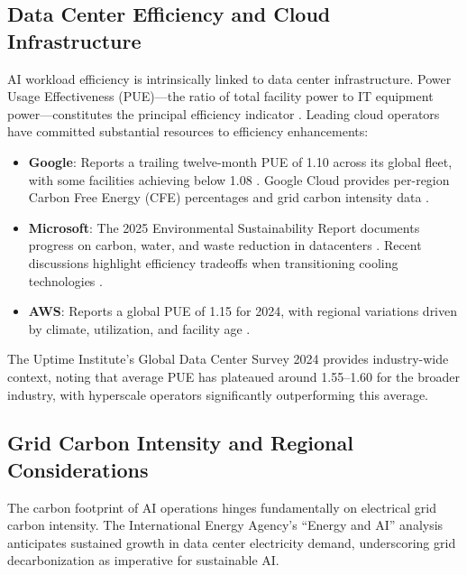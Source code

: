 \documentclass[11pt]{article}
\begin{document}
\subsection{Data Center Efficiency and Cloud Infrastructure}

AI workload efficiency is intrinsically linked to data center infrastructure. Power Usage Effectiveness (PUE)---the ratio of total facility power to IT equipment power---constitutes the principal efficiency indicator \cite{iso2026pue}. Leading cloud operators have committed substantial resources to efficiency enhancements:

\begin{itemize}
    \item \textbf{Google}: Reports a trailing twelve-month PUE of 1.10 across its global fleet, with some facilities achieving below 1.08 \cite{google2024envreport}. Google Cloud provides per-region Carbon Free Energy (CFE) percentages and grid carbon intensity data \cite{googlecloud2026cfe}.
    \item \textbf{Microsoft}: The 2025 Environmental Sustainability Report documents progress on carbon, water, and waste reduction in datacenters \cite{microsoft2025sustainability}. Recent discussions highlight efficiency tradeoffs when transitioning cooling technologies \cite{microsoft2024datacenter}.
    \item \textbf{AWS}: Reports a global PUE of 1.15 for 2024, with regional variations driven by climate, utilization, and facility age \cite{aws2024sustainability, amazon2024pue}.
\end{itemize}

The Uptime Institute's Global Data Center Survey 2024 \cite{uptime2024survey} provides industry-wide context, noting that average PUE has plateaued around 1.55--1.60 for the broader industry, with hyperscale operators significantly outperforming this average.

\subsection{Grid Carbon Intensity and Regional Considerations}

The carbon footprint of AI operations hinges fundamentally on electrical grid carbon intensity. The International Energy Agency's ``Energy and AI'' analysis \cite{iea2025energyai} anticipates sustained growth in data center electricity demand, underscoring grid decarbonization as imperative for sustainable AI.
\end{document}
